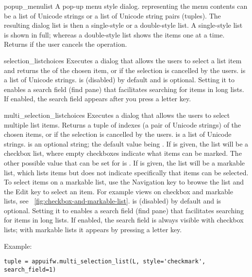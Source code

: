 \begin{funcdesc}{popup_menu}{list}
A pop-up menu style dialog.  representing the menu 
contents can be a list of Unicode strings or a list of Unicode string pairs 
(tuples). The resulting dialog list is then a single-style or a double-style 
list. A single-style list is shown in full; whereas a double-style list 
shows the items one at a time. Returns  if the user cancels the 
operation.
\end{funcdesc}

\begin{funcdesc}{selection_list}{choices}
Executes a dialog that allows the users to select a list item and
returns the  of the chosen item, or  if the
selection is cancelled by the users.  is a list of
Unicode strings.
 is  (disabled) by default and is optional. Setting it to  enables a search field (find pane) that facilitates searching for items in long lists. If enabled, the search field appears after you press a letter key.
\end{funcdesc}

\begin{funcdesc}{multi_selection_list}{choices}
  Executes a dialog that allows the users to select multiple list
  items.  Returns a tuple of indexes (a pair of Unicode strings) of
  the chosen items, or  if the selection is cancelled by
  the users.  is a list of Unicode strings.  
  is an optional string; the default value being .
  If  is given, the list will be a checkbox list,
  where empty checkboxes indicate what items can be marked. The other
  possible value that can be set for  is
  . If  is given, the list will be
  a markable list, which lists items but does not indicate
  specifically that items can be selected. To select items on a
  markable list, use the Navigation key to browse the list and the
  Edit key to select an item. For example views on checkbox and
  markable lists, see
  \figurename~\ref{fig:checkbox-and-markable-list}.
   is  (disabled) by default and is
  optional. Setting it to  enables a search field (find pane)
  that facilitates searching for items in long lists. If enabled, the
  search field is always visible with checkbox lists; with markable
  lists it appears by pressing a letter key.

Example:
\begin{verbatim}
tuple = appuifw.multi_selection_list(L, style='checkmark', search_field=1)
\end{verbatim}
\end{funcdesc}

